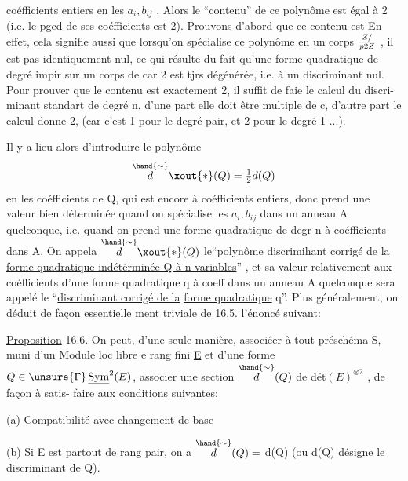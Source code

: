 
coéfficients entiers en les $a_i,b_{ij}$ . Alors le ``contenu'' de ce polynôme
est égal à 2 (i.e. le pgcd de ses coéfficients est 2).
 Prouvons d'abord que ce contenu est 
En effet, cela signifie aussi que  lorsqu'on spécialise ce polynôme
en un corps $Z/\over{p}{2}Z$\hand{)} , il est pas identiquement nul, ce qui 
résulte du fait qu'une forme quadratique de degré impir sur un corps de
car 2 est tjrs dégénérée, i.e. à un discriminant nul. Pour prouver
que le contenu  est exactement 2, il suffit de faie le calcul du discri-%
minant  standart de degré n, d'une part elle doit être multiple de c,
d'autre part le calcul donne 2, (car c'est 1 pour le degré pair, et 2 pour
le degré 1 ...).

 Il y a lieu alors d'introduire le polynôme
\[ \overset{\hand{\sim}}{d}\xout{*}(Q) = \tfrac{1}{2}d(Q) \]
en les coéfficients de Q, qui est encore à coéfficients entiers, donc
prend une valeur bien déterminée quand on spécialise les $a_i,b_{ij}$ dans un
anneau A quelconque, i.e. quand on prend une forme quadratique de degr
n à coéfficients dans A. On appela $\overset{\hand{\sim}}{d}\xout{*}(Q)$ le``\uline{polynôme} \uline{discrimihant}
\uline{corrigé de la forme quadratique indétérminée Q à n variables}'' , et sa
valeur relativement aux coéfficients d'une forme quadratique q à coeff
dans un anneau A quelconque sera appelé le ``\uline{discriminant corrigé de la}
\uline{forme quadratique} q''. Plus généralement, on déduit de façon essentielle
ment triviale de 16.5. l'énoncé suivant:

\uline{Proposition} 16.6. On peut,  d'une seule manière, associéer à tout
préschéma S, muni d'un Module loc libre e rang fini \uline{E} et d'une forme 
$Q \in \unsure{\Gamma}\,\underline{\mathrm{Sym}}^2(E)$, associer une section $\overset{\hand{\sim}}{d}(Q)$ de dét$(E)^{\otimes 2}$ , de façon à satis-%
faire aux conditions suivantes:

(a) Compatibilité avec changement de base

(b) Si E est partout de rang pair, on a $\overset{\hand{\sim}}{d}(Q) =$ d(Q) (ou d(Q)
désigne le discriminant de Q).


